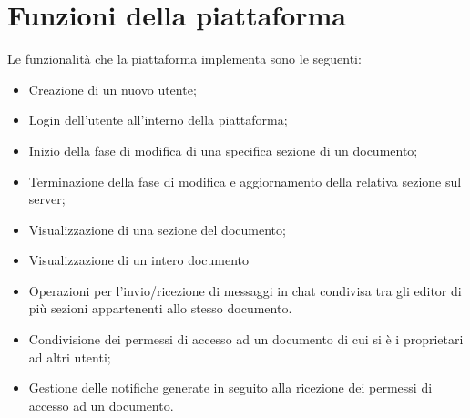 \section{Funzioni della piattaforma}
Le funzionalità che la piattaforma implementa sono le seguenti:
\begin{itemize}
	\item Creazione di un nuovo utente;
	\item Login dell'utente all'interno della piattaforma;
	\item Inizio della fase di modifica di una specifica sezione di un documento;
	\item Terminazione della fase di modifica e aggiornamento della relativa sezione sul server;
	\item Visualizzazione di una sezione del documento;
	\item Visualizzazione di un intero documento
	\item Operazioni per l'invio/ricezione di messaggi in chat condivisa tra gli editor di più sezioni appartenenti allo stesso documento.
	\item Condivisione dei permessi di accesso ad un documento di cui si è i proprietari ad altri utenti;
	\item Gestione delle notifiche generate in seguito alla ricezione dei permessi di accesso ad un documento.
\end{itemize}